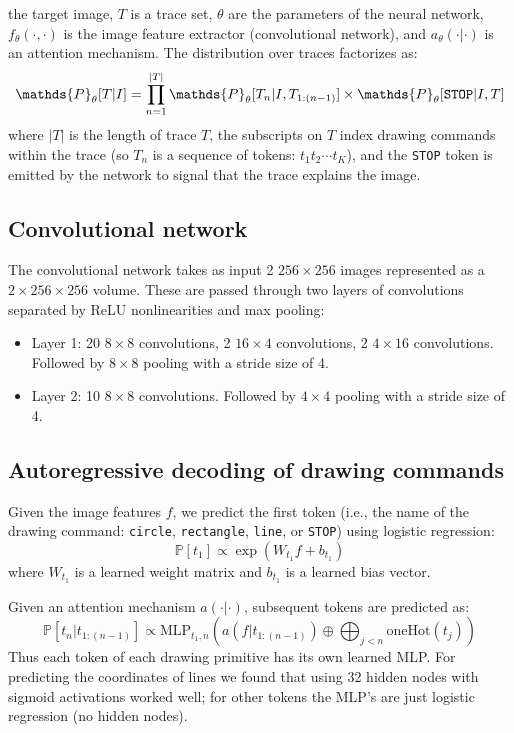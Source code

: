 \documentclass{article}
\newcommand{\probability}{\mathds{P}} %
\begin{document}
the target image, $T$ is a trace set, $\theta$ are the
parameters of the neural network, $f_\theta(\cdot,\cdot)$ is the
image feature extractor (convolutional network), and $a_\theta(\cdot|\cdot)$ is an attention mechanism. The distribution over
traces factorizes as:
\begin{equation}
  \probability_\theta [T|I] = \prod_{n = 1}^{|T|} \probability_\theta [T_n | I,T_{1:(n-1)}]\times\probability_\theta [\verb|STOP| | I,T]\label{objective}
\end{equation}
where $|T|$ is the length of trace $T$, the subscripts
on $T$ index drawing commands within the trace (so $T_n$ is a sequence of tokens: $t_1t_2\cdots t_K$), and the \verb|STOP|
token is emitted by the network to signal that the trace
explains the image.

\subsection{Convolutional network}
The convolutional network takes as input 2 $256\times 256$ images
represented as a $2\times 256\times 256$ volume. These are
passed through two layers of convolutions separated by ReLU
nonlinearities and max pooling:
\begin{itemize}
\item Layer 1: 20 $8\times 8$ convolutions, 2 $16\times 4$ convolutions, 2 $4\times 16$ convolutions. Followed by $8\times 8$ pooling with a stride size of 4.
\item Layer 2: 10 $8\times 8$ convolutions. Followed by $4\times 4$ pooling with a stride size of 4.
\end{itemize}


\subsection{Autoregressive decoding of drawing commands}

Given the image features $f$, we predict the first token (i.e., the name of the drawing command: \verb|circle|, \verb|rectangle|, \verb|line|, or \verb|STOP|) using logistic regression:
\begin{equation}
  \probability [t_1]\propto \exp\left( W_{t_1}f + b_{t_1}\right)
\end{equation}
where $W_{t_1}$ is a learned weight matrix and  $b_{t_1}$ is a learned bias vector.

Given an attention mechanism $a(\cdot | \cdot)$, subsequent tokens are predicted as:
\begin{equation}
  \probability [t_n|t_{1:(n - 1)}]\propto \text{MLP}_{t_1,n}(a(f|t_{1:(n - 1)}) \oplus \bigoplus_{j < n} \text{oneHot}(t_j))\label{discreteTokenPrediction}
\end{equation}
Thus each token of each drawing primitive has its own learned MLP.
For predicting the coordinates of lines we found that using 32 hidden nodes with sigmoid activations worked well;
for other tokens the MLP's are just logistic regression (no hidden nodes).
\end{document}
